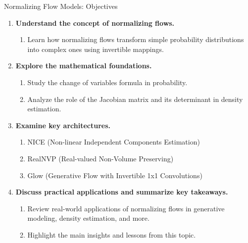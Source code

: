 \begin{frame}[allowframebreaks]{Normalizing Flow Models: Objectives}
    \begin{enumerate}
        \setlength{\itemsep}{-0.1em}
        \item \textbf{Understand the concept of normalizing flows.}
        \begin{enumerate}
            \setlength{\itemsep}{-0.5em}
            \item Learn how normalizing flows transform simple probability distributions into complex ones using invertible mappings.
        \end{enumerate}
        \item \textbf{Explore the mathematical foundations.}
        \begin{enumerate}
            \setlength{\itemsep}{-0.5em}
            \item Study the change of variables formula in probability.
            \item Analyze the role of the Jacobian matrix and its determinant in density estimation.
        \end{enumerate}
        \item \textbf{Examine key architectures.}
        \begin{enumerate}
            \setlength{\itemsep}{-0.5em}
            \item NICE (Non-linear Independent Components Estimation)
            \item RealNVP (Real-valued Non-Volume Preserving)
            \item Glow (Generative Flow with Invertible 1x1 Convolutions)
        \end{enumerate}
        \item \textbf{Discuss practical applications and summarize key takeaways.}
        \begin{enumerate}
            \setlength{\itemsep}{-0.5em}
            \item Review real-world applications of normalizing flows in generative modeling, density estimation, and more.
            \item Highlight the main insights and lessons from this topic.
        \end{enumerate}
    \end{enumerate}
\end{frame}


